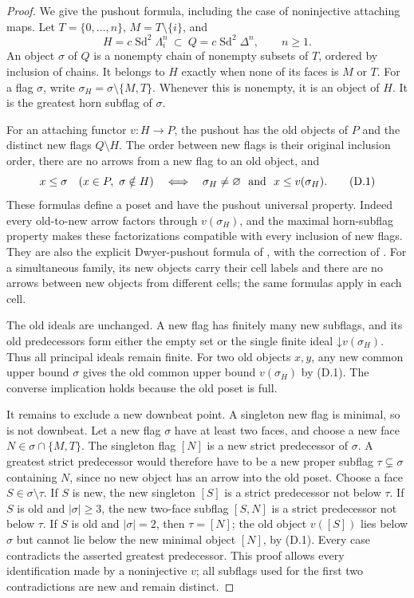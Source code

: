 \begin{proof}
We give the pushout formula, including the case of noninjective attaching maps. Let $T=\{0,\ldots,n\}$, $M=T\setminus\{i\}$, and
\[
 H=c\operatorname{Sd}^2\Lambda_i^n\ \subset\
 Q=c\operatorname{Sd}^2\Delta^n,
 \qquad n\ge1.
\]
An object $\sigma$ of $Q$ is a nonempty chain of nonempty subsets of $T$, ordered by inclusion of chains. It belongs to $H$ exactly when none of its faces is $M$ or $T$. For a flag $\sigma$, write
$\sigma_H=\sigma\setminus\{M,T\}$.
Whenever this is nonempty, it is an object of $H$. It is the greatest horn subflag of $\sigma$.

For an attaching functor $v:H\to P$, the pushout has the old objects of $P$ and the distinct new flags $Q\setminus H$. The order between new flags is their original inclusion order, there are no arrows from a new flag to an old object, and
\[
 x\le\sigma\quad(x\in P,\ \sigma\notin H)
 \quad\Longleftrightarrow\quad
 \sigma_H\ne\varnothing\ \hbox{ and }\ x\le v(\sigma_H).
 \tag{D.1}
\]
These formulas define a poset and have the pushout universal property. Indeed every old-to-new arrow factors through $v(\sigma_H)$, and the maximal horn-subflag property makes these factorizations compatible with every inclusion of new flags. They are also the explicit Dwyer-pushout formula of \citet[Section~4]{D_Thomason1980}, with the correction of \citet{D_Cisinski1999}. For a simultaneous family, its new objects carry their cell labels and there are no arrows between new objects from different cells; the same formulas apply in each cell.

The old ideals are unchanged. A new flag has finitely many new subflags, and its old predecessors form either the empty set or the single finite ideal $\mathord\downarrow v(\sigma_H)$. Thus all principal ideals remain finite. For two old objects $x,y$, any new common upper bound $\sigma$ gives the old common upper bound $v(\sigma_H)$ by (D.1). The converse implication holds because the old poset is full.

It remains to exclude a new downbeat point. A singleton new flag is minimal, so is not downbeat. Let a new flag $\sigma$ have at least two faces, and choose a new face $N\in\sigma\cap\{M,T\}$. The singleton flag $[N]$ is a new strict predecessor of $\sigma$. A greatest strict predecessor would therefore have to be a new proper subflag $\tau\subsetneq\sigma$ containing $N$, since no new object has an arrow into the old poset. Choose a face $S\in\sigma\setminus\tau$. If $S$ is new, the new singleton $[S]$ is a strict predecessor not below $\tau$. If $S$ is old and $|\sigma|\ge3$, the new two-face subflag $[S,N]$ is a strict predecessor not below $\tau$. If $S$ is old and $|\sigma|=2$, then $\tau=[N]$; the old object $v([S])$ lies below $\sigma$ but cannot lie below the new minimal object $[N]$, by (D.1). Every case contradicts the asserted greatest predecessor. This proof allows every identification made by a noninjective $v$; all subflags used for the first two contradictions are new and remain distinct.
\end{proof}

